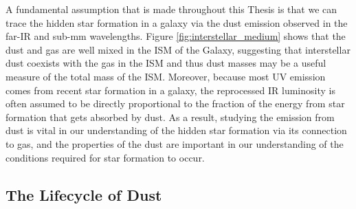 A fundamental assumption that is made throughout this Thesis is that we can trace the hidden star formation in a galaxy via the dust emission observed in the far-IR and sub-mm wavelengths. Figure \ref{fig:interstellar_medium} shows that the dust and gas are well mixed in the ISM of the Galaxy, suggesting that interstellar dust coexists with the gas in the ISM and thus dust masses may be a useful measure of the total mass of the ISM. Moreover, because most UV emission comes from recent star formation in a galaxy, the reprocessed IR luminosity is often assumed to be directly proportional to the fraction of the energy from star formation that gets absorbed by dust. As a result, studying the emission from dust is vital in our understanding of the hidden star formation via its connection to gas, and the properties of the dust are important in our understanding of the conditions required for star formation to occur.

\subsection{The Lifecycle of Dust}
\label{sec:lifecycle_of_dust}

